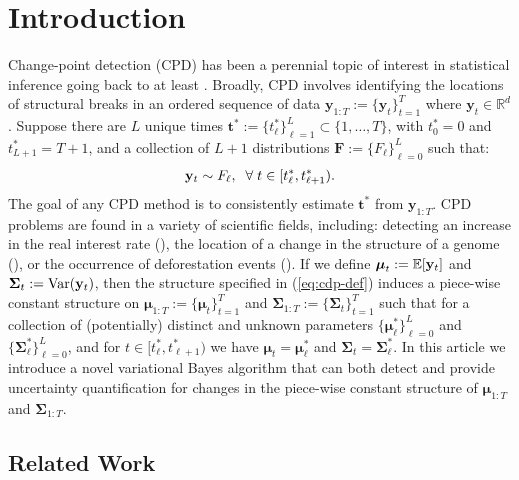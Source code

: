 \section{Introduction}
\label{sec:intro}

Change-point detection (CPD) has been a perennial topic of interest in statistical inference going back to at least \cite{Page54}. Broadly, CPD involves identifying the locations of structural breaks in an ordered sequence of data $\mathbf{y}_{1:T}:= \{\mathbf{y}_t\}_{t=1}^T$ where $\mathbf{y}_t \in \mathbb{R}^d$. Suppose there are $L$ unique times $\mathbf{t}^*:=\{t^*_\ell\}_{\ell=1}^{L} \subset \{1,\ldots,T\}$, with $t^*_0=0$ and $t^*_{L+1} = T+1$, and a collection of $L+1$ distributions $\mathbf{F} := \{F_\ell\}_{\ell=0}^L$ such that:
\begin{align}\label{eq:cdp-def}
    \mathbf{y}_t \sim F_\ell, \;\;\forall\; t \in [t^*_\ell,t^*_{\ell+1}).
\end{align}
The goal of any CPD method is to consistently estimate $\mathbf{t}^*$ from $\mathbf{y}_{1:T}$.  CPD problems are found in a variety of scientific fields, including: detecting an increase in the real interest rate (\citealp{Bai03}), the location of a change in the structure of a genome (\citealp{Muggeo11}), or the occurrence of deforestation events (\citealp{Wendelberger21}). If we define $\boldsymbol{\mu}_t := \mathbb{E}[\mathbf{y}_t]$ and $\boldsymbol{\Sigma}_t := \text{Var}(\mathbf{y}_t)$, then the structure specified in (\ref{eq:cdp-def}) induces a piece-wise constant structure on $\boldsymbol{\mu}_{1:T} := \{\boldsymbol{\mu}_t\}_{t=1}^T$ and $\boldsymbol{\Sigma}_{1:T} := \{\boldsymbol{\Sigma}_t\}_{t=1}^T$ such that for a collection of (potentially) distinct and unknown parameters $\{\boldsymbol{\mu}^*_\ell\}_{\ell=0}^{L}$ and $\{\boldsymbol{\Sigma}^*_\ell\}_{\ell=0}^{L}$, and for $t \in [t^*_\ell,t^*_{\ell+1})$ we have $\boldsymbol{\mu}_t = \boldsymbol{\mu}^*_\ell$ and $\boldsymbol{\Sigma}_t = \boldsymbol{\Sigma}^*_\ell$. In this article we introduce a novel variational Bayes algorithm that can both detect and provide uncertainty quantification for changes in the piece-wise constant structure of $\boldsymbol{\mu}_{1:T}$ and $\boldsymbol{\Sigma}_{1:T}$.

\subsection{Related Work}

